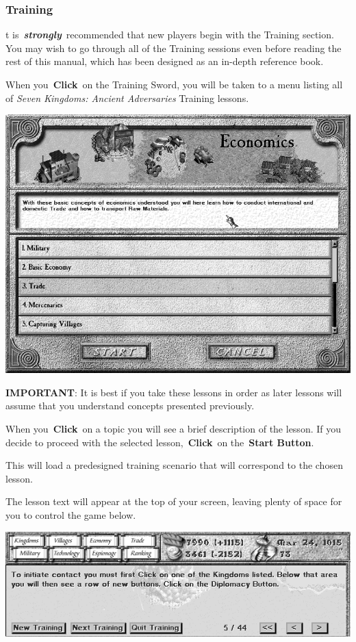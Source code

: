 \subsubsection{Training}

t is \textbf{\textit{strongly}} recommended that new players begin with the Training section. You may wish to go through all of the Training sessions even before reading the rest of this manual, which has been designed as an in-depth reference book.

When you \textbf{Click} on the Training Sword, you will be taken to a menu listing all of \textit{Seven Kingdoms: Ancient Adversaries} Training lessons.

\begin{center}
\includegraphics[width=0.7\linewidth]{Itraining}
\end{center}

\textbf{IMPORTANT}: It is best if you take these lessons in order as later lessons will assume that you understand concepts presented previously.

When you \textbf{Click} on a topic you will see a brief description of the lesson. If you decide to proceed with the selected lesson, \textbf{Click} on the \textbf{Start Button}.

This will load a predesigned training scenario that will correspond to the chosen lesson.

The lesson text will appear at the top of your screen, leaving plenty of space for you to control the game below.

\begin{center}
\includegraphics[width=0.7\linewidth]{Ilesson}
\end{center}

